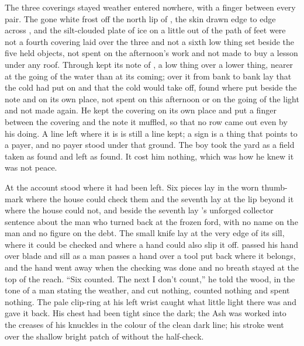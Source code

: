 The three coverings stayed weather entered nowhere, with a finger between every pair. The gone white frost off the north lip of , the skin drawn edge to edge across , and the silt-clouded plate of ice on  a little out of the path of feet were not a fourth covering laid over the three and not a sixth low thing set beside the five held objects, not spent on the afternoon's work and not made to buy a lesson under any roof. Through   kept its note of , a low thing over a lower thing, nearer at the going of the water than at its coming; over it from bank to bank lay  that the cold had put on and that the cold would take off, found where put beside the note and on its own place, not spent on this afternoon or on the going of the light and not made again. He kept the covering on its own place and put a finger between the covering and the note it muffled, so that no row came out even by his doing. A line left where it is is still a line kept; a sign is a thing that points to a payer, and no payer stood under that ground. The boy took the yard as a field taken as found and left as found. It cost him nothing, which was how he knew it was not peace.

\scenebreak

At  the account stood where it had been left. Six pieces lay in the worn thumb-mark where the house could check them and the seventh lay at the lip beyond it where the house could not, and beside the seventh lay 's unforged collector sentence about the man who turned back at the frozen ford, with no name on the man and no figure on the debt. The small knife lay at the very edge of its sill, where it could be checked and where a hand could also slip it off.  passed his hand over blade and sill as a man passes a hand over a tool put back where it belongs, and the hand went away when the checking was done and no breath stayed at the top of the reach. “Six counted. The next I don't count,” he told the wood, in the tone of a man stating the weather, and cut nothing, counted nothing and spent nothing. The pale clip-ring at his left wrist caught what little light there was and gave it back. His chest had been tight since the dark; the Ash was worked into the creases of his knuckles in the colour of the clean dark line; his stroke went over the shallow bright patch of  without the half-check.

